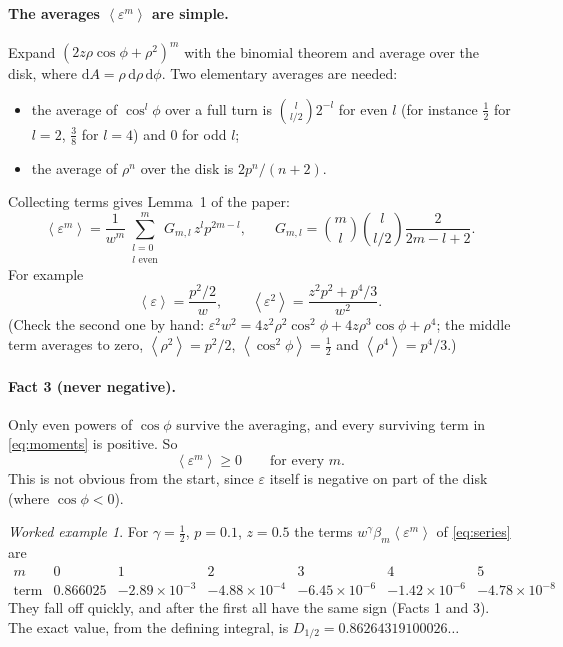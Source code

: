 \documentclass[11pt,a4paper]{article}
\theoremstyle{remark}
\newtheorem*{example}{Worked example}
\newcommand{\avg}[1]{\left\langle #1 \right\rangle}
\newcommand{\dd}{\mathrm{d}}
\begin{document}
\paragraph{The averages $\avg{\varepsilon^m}$ are simple.} Expand
$(2z\rho\cos\phi+\rho^2)^m$ with the binomial theorem and average over the disk, where
$\dd A=\rho\,\dd\rho\,\dd\phi$. Two elementary averages are needed:
\begin{itemize}
  \item the average of $\cos^l\phi$ over a full turn is $\binom{l}{l/2}2^{-l}$ for even $l$
        (for instance $\tfrac12$ for $l=2$, $\tfrac38$ for $l=4$) and $0$ for odd $l$;
  \item the average of $\rho^n$ over the disk is $2p^n/(n+2)$.
\end{itemize}
Collecting terms gives Lemma~1 of the paper:
\begin{equation}
  \avg{\varepsilon^m}=\frac{1}{w^m}\sum_{\substack{l=0\\l\text{ even}}}^m G_{m,l}\,z^l p^{2m-l},
  \qquad G_{m,l}=\binom{m}{l}\binom{l}{l/2}\frac{2}{2m-l+2}.
  \label{eq:moments}
\end{equation}
For example
\[
  \avg{\varepsilon}=\frac{p^2/2}{w},\qquad
  \avg{\varepsilon^2}=\frac{z^2p^2+p^4/3}{w^2}.
\]
(Check the second one by hand: $\varepsilon^2w^2=4z^2\rho^2\cos^2\phi+4z\rho^3\cos\phi+\rho^4$;
the middle term averages to zero, $\avg{\rho^2}=p^2/2$, $\avg{\cos^2\phi}=\tfrac12$ and
$\avg{\rho^4}=p^4/3$.)

\paragraph{Fact 3 (never negative).} Only even powers of $\cos\phi$ survive the averaging, and
every surviving term in \eqref{eq:moments} is positive. So
\[
  \avg{\varepsilon^m}\ge0\qquad\text{for every }m.
\]
This is not obvious from the start, since $\varepsilon$ itself is negative on part of the disk
(where $\cos\phi<0$).

\begin{example}
For $\gamma=\tfrac12$, $p=0.1$, $z=0.5$ the terms $w^\gamma\beta_m\avg{\varepsilon^m}$ of
\eqref{eq:series} are
\[
\begin{array}{c|cccccc}
 m & 0 & 1 & 2 & 3 & 4 & 5\\\hline
 \text{term} & 0.866025 & -2.89\times10^{-3} & -4.88\times10^{-4} & -6.45\times10^{-6} & -1.42\times10^{-6} & -4.78\times10^{-8}
\end{array}
\]
They fall off quickly, and after the first all have the same sign (Facts 1 and 3). The exact
value, from the defining integral, is $D_{1/2}=0.86264319100026\ldots$
\end{example}
\end{document}
